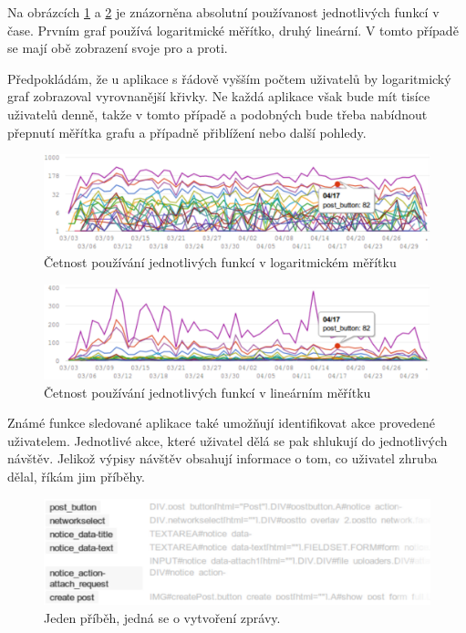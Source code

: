 \documentclass[bc,male,java,dept456]{diploma}						%
\begin{document}
Na obrázcích \ref{img:chumly_features} a \ref{img:chumly_features_nolog} je znázorněna absolutní používanost jednotlivých funkcí v čase. Prvním graf používá logaritmické měřítko, druhý lineární. V tomto případě se mají obě zobrazení svoje pro a proti. 

Předpokládám, že u aplikace s řádově vyšším počtem uživatelů by logaritmický graf zobrazoval vyrovnanější křivky. Ne každá aplikace však bude mít tisíce uživatelů denně, takže v tomto případě a podobných bude třeba nabídnout přepnutí měřítka grafu a případně přiblížení nebo další pohledy.


\begin{figure}[h]
	\centering
	\includegraphics[width=15cm]{img/chumly_features_small_nolegend.pdf}
	\caption{Četnost používání jednotlivých funkcí v logaritmickém měřítku}
	\label{img:chumly_features}
\end{figure}


\begin{figure}[h]
	\centering
	\includegraphics[width=15cm]{img/chumly_features_small_nolog_nolegend.pdf}
	\caption{Četnost používání jednotlivých funkcí v lineárním měřítku}
	\label{img:chumly_features_nolog}
\end{figure}

Známé funkce sledované aplikace také umožňují identifikovat akce provedené u\-ži\-va\-te\-lem. Jednotlivé akce, které uživatel dělá se pak shlukují do jednotlivých návštěv. Jelikož výpisy návštěv obsahují informace o tom, co uživatel zhruba dělal, říkám jim příběhy.

\begin{figure}[h]
	\centering
	\includegraphics[width=14.65cm]{img/user_story.pdf}
	\caption{Jeden příběh, jedná se o vytvoření zprávy.}
	\label{img:user_story}
\end{figure}
\end{document}
